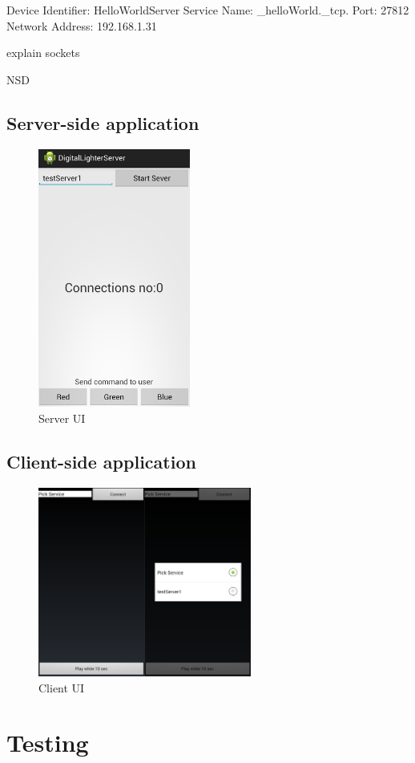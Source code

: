 Device Identifier: HelloWorldServer
Service Name: \_helloWorld.\_tcp.
Port: 27812
Network Address: 192.168.1.31

explain sockets

NSD

\subsection{Server-side application}
\begin{figure}[H]
	\centering
		\includegraphics[width=5cm]{sprint1/server_ui.png}
	\caption{Server UI}
	\label{fig:Server_UI }
\end{figure}

\subsection{Client-side application}
\begin{figure}[H]
	\centering
		\includegraphics[width=7cm]{sprint1/user_ui.png}
	\caption{Client UI}
	\label{fig:Client_UI }
\end{figure}

\section{Testing}

